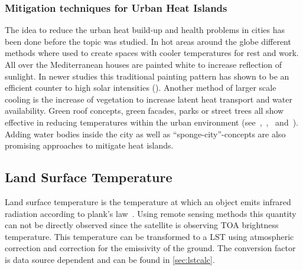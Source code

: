 \documentclass[12pt,a4paper, english,twoside]{article}
\begin{document}
    \subsubsection{Mitigation techniques for Urban Heat Islands}\label{ssec:mitigation}
      The idea to reduce the urban heat build-up and health problems in cities has been done before the topic was studied. 
      In hot areas around the globe different methods where used to create spaces with cooler temperatures for rest and work. 
      All over the Mediterranean houses are painted white to increase reflection of sunlight. 
      In newer studies this traditional painting pattern has shown to be an efficient counter to high solar intensities (\cite{Fayad2021}).
      Another method of larger scale cooling is the increase of vegetation to increase latent heat transport and water availability.
      Green roof concepts, green facades, parks or street trees all show effective in reducing temperatures within the urban environment (see~\cite{Ramamurthy2014},~\cite{Feyisa2014},~\cite{Dimoudi2003} and~\cite{Gartland2008}).
      Adding water bodies inside the city as well as ``sponge-city''-concepts are also promising approaches to mitigate heat islands. %

  \subsection{Land Surface Temperature}\label{ssec:lst}
      Land surface temperature is the temperature at which an object emits infrared radiation according to plank's law~\cite{Liang2020}.
      Using remote sensing methods this quantity can not be directly observed since the satellite is observing \gls{TOA} brightness temperature.
      This temperature can be transformed to a \gls{LST} using atmospheric correction and correction for the emissivity of the ground.
      The conversion factor is data source dependent and can be found in \cref{sec:lstcalc}.

%
\end{document}
